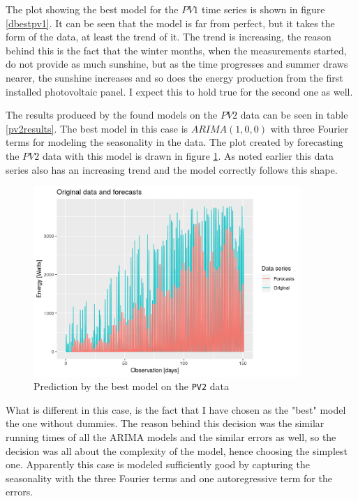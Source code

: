 \documentclass[12pt,a4paper,titlepage]{report}
\begin{document}
The plot showing the best model for the $ PV1 $ time series is shown in figure \ref{dbestpv1}. It can be seen that the model is far from perfect, but it takes the form of the data, at least the trend of it. The trend is increasing, the reason behind this is the fact that the winter months, when the measurements started, do not provide as much sunshine, but as the time progresses and summer draws nearer, the sunshine increases and so does the energy production from the first installed photovoltaic panel. I expect this to hold true for the second one as well.

The results produced by the found models on the $ PV2 $ data can be seen in table \ref{pv2results}.
The best model in this case is $ ARIMA(1,0,0) $ with three Fourier terms for modeling the seasonality in the data. The plot created by forecasting the $ PV2 $ data with this model is drawn in figure \ref{dbestpv2}. As noted earlier this data series also has an increasing trend and the model correctly follows this shape.

\begin{figure}[h]
    \centering
    \includegraphics[width=0.9\textwidth]{dbestpv2}
    \caption{Prediction by the best model on the \texttt{PV2} data}
    \label{dbestpv2}
\end{figure}

What is different in this case, is the fact that I have chosen as the "best" model the one without dummies. The reason behind this decision was the similar running times of all the ARIMA models and the similar errors as well, so the decision was all about the complexity of the model, hence choosing the simplest one. Apparently this case is modeled sufficiently good by capturing the seasonality with the three Fourier terms and one autoregressive term for the errors.
\end{document}

